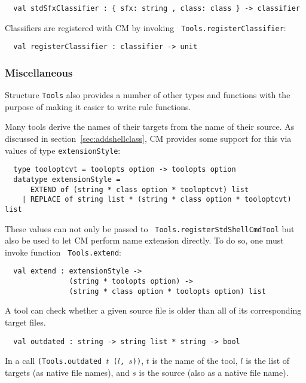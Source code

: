 \begin{verbatim}
  val stdSfxClassifier : { sfx: string , class: class } -> classifier
\end{verbatim}

Classifiers are registered with CM by invoking {\tt
Tools.registerClassifier}:

\begin{verbatim}
  val registerClassifier : classifier -> unit
\end{verbatim}

\subsubsection{Miscellaneous}

Structure {\tt Tools} also provides a number of other types and
functions with the purpose of making it easier to write rule
functions.

 Many tools derive the names of
their targets from the name of their source.  As discussed in
section~\ref{sec:addshellclass}, CM provides some support for this via
values of type {\tt extensionStyle}:

\begin{verbatim}
  type tooloptcvt = toolopts option -> toolopts option
  datatype extensionStyle =
      EXTEND of (string * class option * tooloptcvt) list
    | REPLACE of string list * (string * class option * tooloptcvt) list
\end{verbatim}

These values can not only be passed to {\tt
Tools.registerStdShellCmdTool} but also be used to let CM perform name
extension directly.  To do so, one must invoke function {\tt
Tools.extend}:

\begin{verbatim}
  val extend : extensionStyle ->
               (string * toolopts option) ->
               (string * class option * toolopts option) list
\end{verbatim}

 A tool can check whether a given
source file is older than all of its corresponding target files.

\begin{verbatim}
  val outdated : string -> string list * string -> bool
\end{verbatim}

In a call {\tt (Tools.outdated $t$ ($l$, $s$))}, $t$ is the name of
the tool, $l$ is the list of targets (as native file names), and $s$
is the source (also as a native file name).

